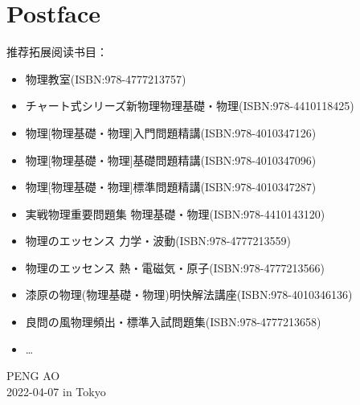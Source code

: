 
\chapter*{Postface}

推荐拓展阅读书目：
\begin{itemize}
    \item 物理教室(ISBN:978-4777213757)
    \item チャート式シリーズ新物理物理基礎・物理(ISBN:978-4410118425)
    \item 物理[物理基礎・物理]入門問題精講(ISBN:978-4010347126)
    \item 物理[物理基礎・物理]基礎問題精講(ISBN:978-4010347096)
    \item 物理[物理基礎・物理]標準問題精講(ISBN:978-4010347287)
    \item 実戦物理重要問題集 物理基礎・物理(ISBN:978-4410143120)
    \item 物理のエッセンス 力学・波動(ISBN:978-4777213559)
    \item 物理のエッセンス 熱・電磁気・原子(ISBN:978-4777213566)
    \item 漆原の物理(物理基礎・物理)明快解法講座(ISBN:978-4010346136)
    \item 良問の風物理頻出・標準入試問題集(ISBN:978-4777213658)
    \item \ldots
\end{itemize}

\vfill
\begin{flushright}
    PENG AO\\
    2022-04-07 in Tokyo
\end{flushright}
